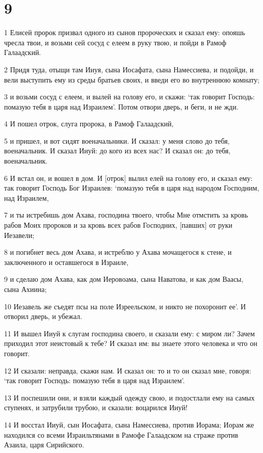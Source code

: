 \chapter{9}

\par 1 Елисей пророк призвал одного из сынов пророческих и сказал ему: опояшь чресла твои, и возьми сей сосуд с елеем в руку твою, и пойди в Рамоф Галаадский.
\par 2 Придя туда, отыщи там Ииуя, сына Иосафата, сына Намессиева, и подойди, и вели выступить ему из среды братьев своих, и введи его во внутреннюю комнату;
\par 3 и возьми сосуд с елеем, и вылей на голову его, и скажи: `так говорит Господь: помазую тебя в царя над Израилем'. Потом отвори дверь, и беги, и не жди.
\par 4 И пошел отрок, слуга пророка, в Рамоф Галаадский,
\par 5 и пришел, и вот сидят военачальники. И сказал: у меня слово до тебя, военачальник. И сказал Ииуй: до кого из всех нас? И сказал он: до тебя, военачальник.
\par 6 И встал он, и вошел в дом. И [отрок] вылил елей на голову его, и сказал ему: так говорит Господь Бог Израилев: `помазую тебя в царя над народом Господним, над Израилем,
\par 7 и ты истребишь дом Ахава, господина твоего, чтобы Мне отмстить за кровь рабов Моих пророков и за кровь всех рабов Господних, [павших] от руки Иезавели;
\par 8 и погибнет весь дом Ахава, и истреблю у Ахава мочащегося к стене, и заключенного и оставшегося в Израиле,
\par 9 и сделаю дом Ахава, как дом Иеровоама, сына Наватова, и как дом Ваасы, сына Ахиина;
\par 10 Иезавель же съедят псы на поле Изреельском, и никто не похоронит ее'. И отворил дверь, и убежал.
\par 11 И вышел Ииуй к слугам господина своего, и сказали ему: с миром ли? Зачем приходил этот неистовый к тебе? И сказал им: вы знаете этого человека и что он говорит.
\par 12 И сказали: неправда, скажи нам. И сказал он: то и то он сказал мне, говоря: `так говорит Господь: помазую тебя в царя над Израилем'.
\par 13 И поспешили они, и взяли каждый одежду свою, и подостлали ему на самых ступенях, и затрубили трубою, и сказали: воцарился Ииуй!
\par 14 И восстал Ииуй, сын Иосафата, сына Намессиева, против Иорама; Иорам же находился со всеми Израильтянами в Рамофе Галаадском на страже против Азаила, царя Сирийского.

